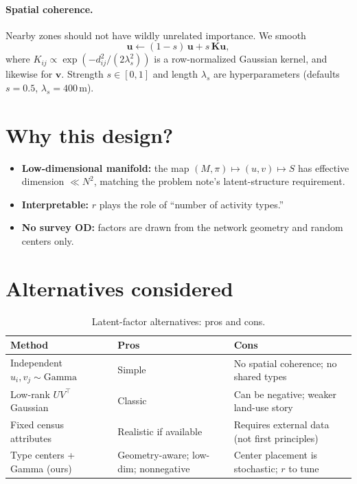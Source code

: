 \documentclass[11pt,a4paper]{report}
\newcommand{\mathbfu}{\mathbf{u}}
\newcommand{\mathbfv}{\mathbf{v}}
\begin{document}
\paragraph{Spatial coherence.}
Nearby zones should not have wildly unrelated importance. We smooth
\[
  \mathbfu \leftarrow (1-s)\, \mathbfu + s\, \mathbf{K}\mathbfu,
\]
where $K_{ij}\propto\exp(-d_{ij}^2/(2\lambda_s^2))$ is a row-normalized Gaussian kernel, and likewise for $\mathbfv$. Strength $s\in[0,1]$ and length $\lambda_s$ are hyperparameters (defaults $s=0.5$, $\lambda_s=400\,\mathrm{m}$).

\section{Why this design?}

\begin{itemize}[leftmargin=*]
    \item \textbf{Low-dimensional manifold:} the map $(M,\pi)\mapsto (u,v)\mapsto S$ has effective dimension $\ll N^2$, matching the problem note's latent-structure requirement.
    \item \textbf{Interpretable:} $r$ plays the role of ``number of activity types.''
    \item \textbf{No survey OD:} factors are drawn from the network geometry and random centers only.
\end{itemize}

\section{Alternatives considered}

\begin{table}[ht]
\centering
\caption{Latent-factor alternatives: pros and cons.}
\label{tab:fp-latent-pros}
\small
\begin{tabular}{@{}p{3.2cm}p{5.1cm}p{5.1cm}@{}}
\toprule
\textbf{Method} & \textbf{Pros} & \textbf{Cons} \\
\midrule
Independent $u_i,v_j\sim\mathrm{Gamma}$ &
Simple &
No spatial coherence; no shared types \\
Low-rank $UV^\top$ Gaussian &
Classic &
Can be negative; weaker land-use story \\
Fixed census attributes &
Realistic if available &
Requires external data (not first principles) \\
Type centers + Gamma (ours) &
Geometry-aware; low-dim; nonnegative &
Center placement is stochastic; $r$ to tune \\
\bottomrule
\end{tabular}
\end{table}
\end{document}
